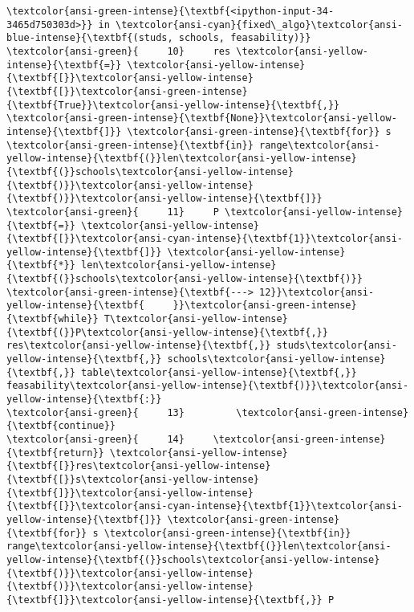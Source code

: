 \documentclass[11pt]{article}
\begin{document}
\begin{Verbatim}[commandchars=\\\{\}, frame=single, framerule=2mm, rulecolor=\color{outerrorbackground}]
\textcolor{ansi-green-intense}{\textbf{<ipython-input-34-3465d750303d>}} in \textcolor{ansi-cyan}{fixed\_algo}\textcolor{ansi-blue-intense}{\textbf{(studs, schools, feasability)}}
\textcolor{ansi-green}{     10}     res \textcolor{ansi-yellow-intense}{\textbf{=}} \textcolor{ansi-yellow-intense}{\textbf{[}}\textcolor{ansi-yellow-intense}{\textbf{[}}\textcolor{ansi-green-intense}{\textbf{True}}\textcolor{ansi-yellow-intense}{\textbf{,}} \textcolor{ansi-green-intense}{\textbf{None}}\textcolor{ansi-yellow-intense}{\textbf{]}} \textcolor{ansi-green-intense}{\textbf{for}} s \textcolor{ansi-green-intense}{\textbf{in}} range\textcolor{ansi-yellow-intense}{\textbf{(}}len\textcolor{ansi-yellow-intense}{\textbf{(}}schools\textcolor{ansi-yellow-intense}{\textbf{)}}\textcolor{ansi-yellow-intense}{\textbf{)}}\textcolor{ansi-yellow-intense}{\textbf{]}}
\textcolor{ansi-green}{     11}     P \textcolor{ansi-yellow-intense}{\textbf{=}} \textcolor{ansi-yellow-intense}{\textbf{[}}\textcolor{ansi-cyan-intense}{\textbf{1}}\textcolor{ansi-yellow-intense}{\textbf{]}} \textcolor{ansi-yellow-intense}{\textbf{*}} len\textcolor{ansi-yellow-intense}{\textbf{(}}schools\textcolor{ansi-yellow-intense}{\textbf{)}}
\textcolor{ansi-green-intense}{\textbf{---> 12}}\textcolor{ansi-yellow-intense}{\textbf{     }}\textcolor{ansi-green-intense}{\textbf{while}} T\textcolor{ansi-yellow-intense}{\textbf{(}}P\textcolor{ansi-yellow-intense}{\textbf{,}} res\textcolor{ansi-yellow-intense}{\textbf{,}} studs\textcolor{ansi-yellow-intense}{\textbf{,}} schools\textcolor{ansi-yellow-intense}{\textbf{,}} table\textcolor{ansi-yellow-intense}{\textbf{,}} feasability\textcolor{ansi-yellow-intense}{\textbf{)}}\textcolor{ansi-yellow-intense}{\textbf{:}}
\textcolor{ansi-green}{     13}         \textcolor{ansi-green-intense}{\textbf{continue}}
\textcolor{ansi-green}{     14}     \textcolor{ansi-green-intense}{\textbf{return}} \textcolor{ansi-yellow-intense}{\textbf{[}}res\textcolor{ansi-yellow-intense}{\textbf{[}}s\textcolor{ansi-yellow-intense}{\textbf{]}}\textcolor{ansi-yellow-intense}{\textbf{[}}\textcolor{ansi-cyan-intense}{\textbf{1}}\textcolor{ansi-yellow-intense}{\textbf{]}} \textcolor{ansi-green-intense}{\textbf{for}} s \textcolor{ansi-green-intense}{\textbf{in}} range\textcolor{ansi-yellow-intense}{\textbf{(}}len\textcolor{ansi-yellow-intense}{\textbf{(}}schools\textcolor{ansi-yellow-intense}{\textbf{)}}\textcolor{ansi-yellow-intense}{\textbf{)}}\textcolor{ansi-yellow-intense}{\textbf{]}}\textcolor{ansi-yellow-intense}{\textbf{,}} P


\end{Verbatim}
\end{document}
